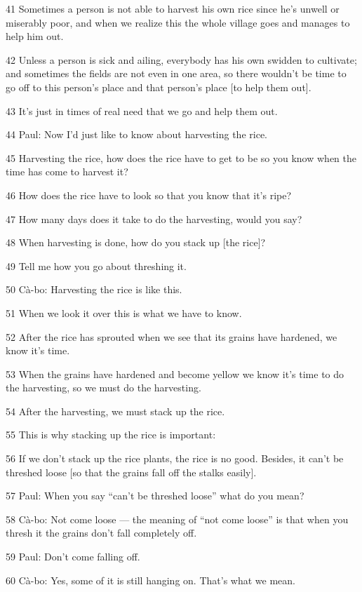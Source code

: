 {41 Sometimes a person is not able to harvest his own rice since he's unwell
or miserably poor, and when we realize this the whole village goes and manages
to help him out.}

{42 Unless a person is sick and ailing, everybody has his own swidden to
cultivate; and sometimes the fields are not even in one area, so there wouldn't
be time to go off to this person's place and that person's place [to help them
out].}

{43 It's just in times of real need that we go and help them out.}

{44 Paul: Now I'd just like to know about harvesting the rice.}

{45 Harvesting the rice, how does the rice have to get to be so you know
when the time has come to harvest it?}

{46 How does the rice have to look so that you know that it's ripe?}

{47 How many days does it take to do the harvesting, would you say?}

{48 When harvesting is done, how do you stack up [the rice]?}

{49 Tell me how you go about threshing it.}

{50 Cà-bo: Harvesting the rice is like this.}

{51 When we look it over this is what we have to know.}

{52 After the rice has sprouted when we see that its grains have hardened,
we know it's time.}

{53 When the grains have hardened and become yellow we know it's time to
do the harvesting, so we must do the harvesting.}

{54 After the harvesting, we must stack up the rice.}

{55 This is why stacking up the rice is important:}

{56 If we don't stack up the rice plants, the rice is no good. Besides,
it can't be threshed loose [so that the grains fall off the stalks easily].}

{57 Paul: When you say ``can't be threshed loose'' what do you mean?}

{58 Cà-bo: Not come loose --- the meaning of ``not come loose'' is that
when you thresh it the grains don't fall completely off.}

{59 Paul: Don't come falling off.}

{60 Cà-bo: Yes, some of it is still hanging on. That's what we mean.}

